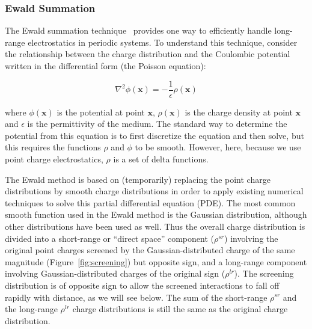 \documentclass[9pt,bestpractices]{livecoms}
\begin{document}
\subsubsection{ Ewald Summation}

The Ewald summation technique~\cite{Ewald_1921} provides one way to efficiently handle long-range electrostatics in periodic systems.
To understand this technique, consider the relationship between the charge distribution and the Coulombic potential written in the differential form (the Poisson equation):

\[
\nabla^2 \phi(\boldsymbol{x}) = - \frac{1}{\epsilon} \rho(\boldsymbol{x})
\]

\noindent where  $\phi(\boldsymbol{x})$ is the potential at point $\boldsymbol{x}$, $\rho(\boldsymbol{x})$ is the charge density at point $\boldsymbol{x}$ and $\epsilon$ is the permittivity of the medium.
The standard way to determine the potential from this equation is to first discretize the equation and then solve, but this requires the functions  $\rho$ and $\phi$ to be smooth.
However, here, because we use point charge electrostatics, $\rho$ is a set of delta functions.

The Ewald method is based on (temporarily) replacing the point charge distributions by smooth charge distributions in order to apply existing numerical techniques to solve this partial differential equation (PDE).
The most common smooth function used in the Ewald method is the Gaussian distribution, although other distributions have been used as well.
Thus the overall charge distribution is divided into a short-range or ``direct space'' component ($\rho^{sr}$) involving the original point charges screened by the Gaussian-distributed charge of the same magnitude (Figure~\ref{fig:screening}) but opposite sign, and a long-range component involving Gaussian-distributed charges of the original sign ($\rho^{lr}$).
The screening distribution is of opposite sign to allow the screened interactions to fall off rapidly with distance, as we will see below.
The sum of the short-range $\rho^{sr}$ and the long-range $\rho^{lr}$ charge distributions is still the same as the original charge distribution.
\end{document}
